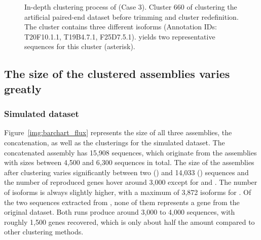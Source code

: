 \documentclass[12pt,a4paper,english]{article}
\begin{document}
		\begin{figure}[H]
			\centering
			\def\svgwidth{0.7\textwidth}
			
			\caption[In-depth clustering process of \karma (Case 3).]{In-depth clustering process of \karma (Case 3). Cluster 660 of clustering the artificial paired-end dataset before trimming and cluster redefinition. The cluster contains three different isoforms (Annotation IDs: T20F10.1.1, T19B4.7.1, F25D7.5.1). \mcl yields two representative sequences for this cluster (asterisk).}
			\label{img:cluster660}
		\end{figure}

	
	\subsection{The size of the clustered assemblies varies greatly}

	\subsubsection*{Simulated \celegans dataset}
	
	    Figure~\ref{img:barchart_flux} represents the size of all three assemblies, the concatenation, as well as the clusterings for the simulated \celegans dataset.
		The concatenated assembly has 15,908 sequences, which originate from the assemblies with sizes between 4,500 and 6,300 sequences in total.
		The size of the assemblies after clustering varies significantly between two (\grouper) and 14,033 (\mclust) sequences and the number of reproduced genes hover around 3,000 except for \karma and \grouper. The number of isoforms is always slightly higher, with a maximum of 3,872 isoforms for \mclust.
		Of the two sequences extracted from \grouper, none of them represents a gene from the original dataset.
		Both \karma runs produce around 3,000 to 4,000 sequences, with roughly 1,500 genes recovered, which is only about half the amount compared to other clustering methods.
	
\end{document}
